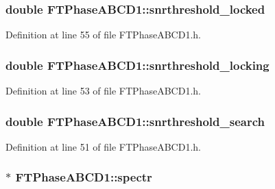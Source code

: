 \hypertarget{classFTPhaseABCD1_ab15e502bb15bcb083a719c9e9a10135c}{
\subsubsection[{snrthreshold\_\-locked}]{\setlength{\rightskip}{0pt plus 5cm}double {\bf FTPhaseABCD1::snrthreshold\_\-locked}}}
\label{classFTPhaseABCD1_ab15e502bb15bcb083a719c9e9a10135c}


Definition at line 55 of file FTPhaseABCD1.h.

\hypertarget{classFTPhaseABCD1_ade2b7bc75653e7c0f11c2ceea1a483e9}{
\subsubsection[{snrthreshold\_\-locking}]{\setlength{\rightskip}{0pt plus 5cm}double {\bf FTPhaseABCD1::snrthreshold\_\-locking}}}
\label{classFTPhaseABCD1_ade2b7bc75653e7c0f11c2ceea1a483e9}


Definition at line 53 of file FTPhaseABCD1.h.

\hypertarget{classFTPhaseABCD1_a73d2c981e855d4fe78aa936b57a2d607}{
\subsubsection[{snrthreshold\_\-search}]{\setlength{\rightskip}{0pt plus 5cm}double {\bf FTPhaseABCD1::snrthreshold\_\-search}}}
\label{classFTPhaseABCD1_a73d2c981e855d4fe78aa936b57a2d607}


Definition at line 51 of file FTPhaseABCD1.h.

\hypertarget{classFTPhaseABCD1_ab56ac2436c8084fb4601d64686338519}{
\subsubsection[{spectr}]{$\ast$ {\bf FTPhaseABCD1::spectr}}}
\label{classFTPhaseABCD1_ab56ac2436c8084fb4601d64686338519}


